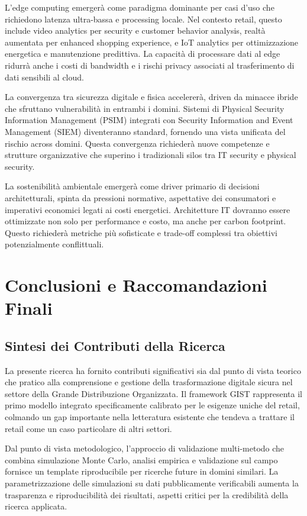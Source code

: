 L'edge computing emergerà come paradigma dominante per casi d'uso che richiedono latenza ultra-bassa e processing locale. Nel contesto retail, questo include video analytics per security e customer behavior analysis, realtà aumentata per enhanced shopping experience, e IoT analytics per ottimizzazione energetica e manutenzione predittiva. La capacità di processare dati al edge ridurrà anche i costi di bandwidth e i rischi privacy associati al trasferimento di dati sensibili al cloud.

La convergenza tra sicurezza digitale e fisica accelererà, driven da minacce ibride che sfruttano vulnerabilità in entrambi i domini. Sistemi di Physical Security Information Management (PSIM) integrati con Security Information and Event Management (SIEM) diventeranno standard, fornendo una vista unificata del rischio across domini. Questa convergenza richiederà nuove competenze e strutture organizzative che superino i tradizionali silos tra IT security e physical security.

La sostenibilità ambientale emergerà come driver primario di decisioni architetturali, spinta da pressioni normative, aspettative dei consumatori e imperativi economici legati ai costi energetici. Architetture IT dovranno essere ottimizzate non solo per performance e costo, ma anche per carbon footprint. Questo richiederà metriche più sofisticate e trade-off complessi tra obiettivi potenzialmente conflittuali.

\section{Conclusioni e Raccomandazioni Finali}

\subsection{Sintesi dei Contributi della Ricerca}

La presente ricerca ha fornito contributi significativi sia dal punto di vista teorico che pratico alla comprensione e gestione della trasformazione digitale sicura nel settore della Grande Distribuzione Organizzata. Il framework GIST rappresenta il primo modello integrato specificamente calibrato per le esigenze uniche del retail, colmando un gap importante nella letteratura esistente che tendeva a trattare il retail come un caso particolare di altri settori.

Dal punto di vista metodologico, l'approccio di validazione multi-metodo che combina simulazione Monte Carlo, analisi empirica e validazione sul campo fornisce un template riproducibile per ricerche future in domini similari. La parametrizzazione delle simulazioni su dati pubblicamente verificabili aumenta la trasparenza e riproducibilità dei risultati, aspetti critici per la credibilità della ricerca applicata.

